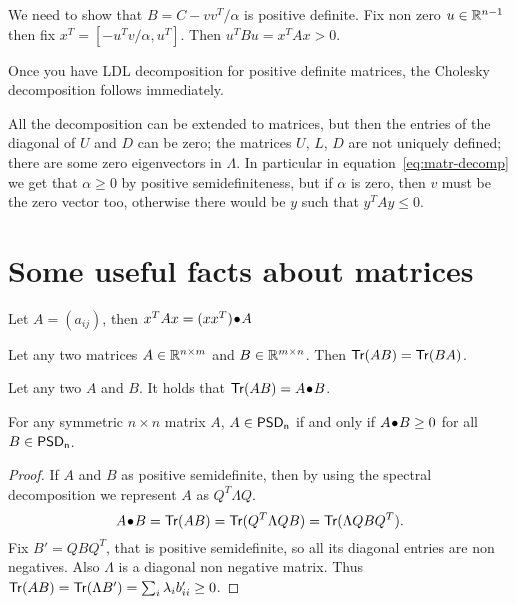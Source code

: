 \documentclass[a4paper,twoside,justified]{tufte-handout}
\begin{document}
We need to show that $B = C - vv^{T}/\alpha $ is positive definite. Fix
non zero $ u\in\mathbb{R}^{n-1} $ then fix $ x^{T}=[-u^{T}v/\alpha, u^{T}]
$. Then $ u^{T}Bu = x^{T}Ax > 0$.

Once you have LDL decomposition for positive definite matrices,
the Cholesky decomposition follows immediately.

All the decomposition can be extended to  matrices, but then the entries of the diagonal of $ U
$ and $D$ can be zero; the matrices $ U $, $ L $, $ D $ are not uniquely
defined; there are some zero eigenvectors in $ \Lambda $. In
particular in equation~\eqref{eq:matr-decomp} we get that $ \alpha
\geq 0 $ by positive semidefiniteness, but if $ \alpha $ is zero, then
$ v $ must be the zero vector too, otherwise there would be $ y $ such that
$ y^{T}Ay \leq 0 $.


\section{Some useful facts about matrices}

\begin{fact}
  Let $ A=(a_{ij}) $, then $x^{T}A x = {(xx^{T})}\!\bullet\!{A}$
\end{fact}

\begin{fact}
  Let any two matrices $ A \in\mathbb{R}^{n\times m}$ and $ B \in\mathbb{R}^{m\times
    n} $. Then $ \mathsf{Tr}(AB)= \mathsf{Tr}(BA)$.
\end{fact}

\begin{fact}
  Let any two  $ A $ and $ B $. It holds that
  $ \mathsf{Tr}(AB)={A}\!\bullet\!{B} $.
\end{fact}

\begin{fact}\label{fact:positive_pointwise}
  For any symmetric $ n \times n $ matrix $ A $, $ A \in
  \mathsf{PSD_{n}} $ if and only if $ {A}\!\bullet\!{B}\geq 0
  $ for all $ B \in \mathsf{PSD_{n}} $.
\end{fact}
\begin{proof}
  If $ A $ and $ B $ as positive semidefinite, then by using the
  spectral decomposition we represent $ A $ as $Q^{T}\Lambda Q$.
  \begin{equation}
    {A}\!\bullet\!{B}=\mathsf{Tr}(AB)=\mathsf{Tr}(Q^{T}\Lambda Q B)
    =\mathsf{Tr}(\Lambda Q B Q^{T}). 
  \end{equation}
  Fix $ B' = Q B Q^{T} $, that is positive semidefinite, so all its
  diagonal entries are non negatives. Also $ \Lambda $ is a diagonal
  non negative matrix. Thus $
  \mathsf{Tr}(AB)=\mathsf{Tr}(\Lambda B')=\sum_{i}\lambda_{i}b'_{ii} \geq 0$.
\end{proof}
\end{document}
